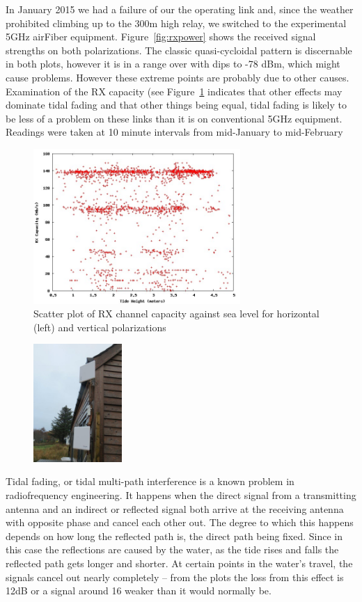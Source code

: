 \documentclass{amsart}
\begin{document}
In January 2015 we had a failure of our the operating link and, since
the weather prohibited climbing up to the 300m high relay, we switched
to the experimental 5GHz airFiber equipment.
Figure~\ref{fig:rxpower} shows the received signal strengths on both
polarizations.  The classic quasi-cycloidal pattern is discernable in
both plots, however it is in a range over with dips to -78 dBm, which
might cause problems.  However these extreme points are probably due
to other causes. Examination of the RX capacity (see
Figure~\ref{fig:capacity} indicates that other effects may dominate tidal
fading and that other things being equal, tidal fading is likely to be
less of a problem on these links than it is on conventional 5GHz
equipment. Readings were taken at 10 minute intervals from mid-January
to mid-February
\begin{figure}
\includegraphics[width=0.7\textwidth]{tidedata/rxcapacity.jpg}
\caption{Scatter plot of RX channel capacity against sea level for
  horizontal (left) and vertical  polarizations}
\label{fig:capacity}
\end{figure}

\begin{figure}
  \includegraphics[width=0.3\textwidth]{tommy-diversity}
\end{figure}
Tidal fading, or tidal multi-path interference is a known problem in
radiofrequency engineering. It happens when the direct signal from
a transmitting antenna and an indirect or reflected signal both arrive at
the receiving antenna with opposite phase and cancel each other
out. The degree to which this happens depends on how long the
reflected path is, the direct path being fixed. Since in this case the
reflections are caused by the water, as the tide rises and falls the
reflected path gets longer and shorter. At certain points in the
water's travel, the signals cancel out nearly completely -- from the
plots the loss from this effect is 12dB or a signal around 16 weaker
than it would normally be.
\end{document}
